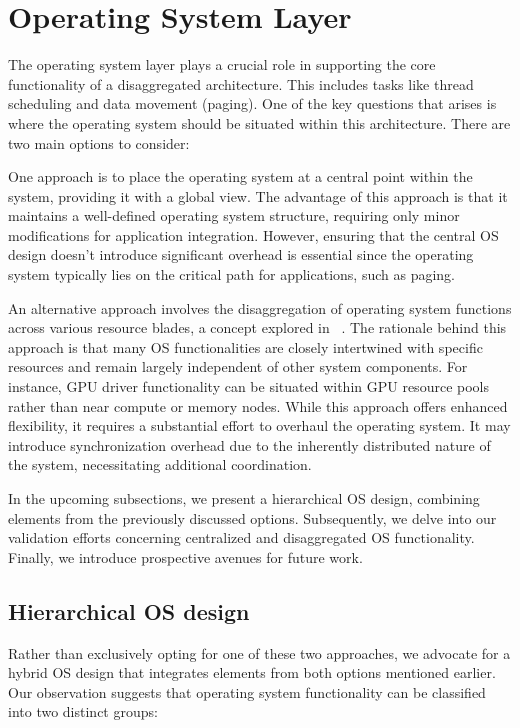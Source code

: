 \chapter{Operating System Layer}
\label{chap:os}
The operating system layer plays a crucial role in supporting the core functionality of a disaggregated architecture. This includes tasks like thread scheduling and data movement (paging). One of the key questions that arises is where the operating system should be situated within this architecture. There are two main options to consider:

 One approach is to place the operating system at a central point within the system, providing it with a global view. The advantage of this approach is that it maintains a well-defined operating system structure, requiring only minor modifications for application integration. However, ensuring that the central OS design doesn't introduce significant overhead is essential since the operating system typically lies on the critical path for applications, such as paging.

 An alternative approach involves the disaggregation of operating system functions across various resource blades, a concept explored in ~\cite{legoos}. The rationale behind this approach is that many OS functionalities are closely intertwined with specific resources and remain largely independent of other system components. For instance, GPU driver functionality can be situated within GPU resource pools rather than near compute or memory nodes. While this approach offers enhanced flexibility, it requires a substantial effort to overhaul the operating system. It may introduce synchronization overhead due to the inherently distributed nature of the system, necessitating additional coordination.

In the upcoming subsections, we present a hierarchical OS design, combining elements from the previously discussed options. Subsequently, we delve into our validation efforts concerning centralized and disaggregated OS functionality. Finally, we introduce prospective avenues for future work.

\section{Hierarchical OS design}

Rather than exclusively opting for one of these two approaches, we advocate for a hybrid OS design that integrates elements from both options mentioned earlier. Our observation suggests that operating system functionality can be classified into two distinct groups:

